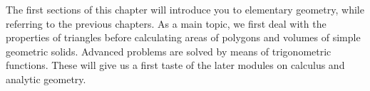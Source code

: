 
\newcommand{\MGrad}{^{\circ}}
\usepackage{ngerman}

\Mtikzexternalize

\MSetSubject{\MINTMathematics}




\begin{MSectionStart}

\MModstartBox

The first sections of this chapter will introduce you to elementary geometry, while referring 
to the previous chapters. As a main topic, we first deal with the properties of triangles before 
calculating areas of polygons and volumes of simple geometric solids. Advanced problems are solved 
by means of trigonometric functions. These will give us a first taste of the later modules 
on calculus and analytic geometry.

 
\end{MSectionStart}




